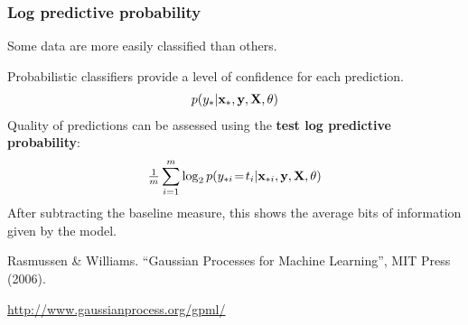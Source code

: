 
\begin{frame}
\frametitle{Log predictive probability}
Some data are more easily classified than others.\par
Probabilistic classifiers provide a level of confidence for each prediction.
\begin{align*}
p(y_*|{\bf x}_*,{\bf y},{\bf X},\theta)
\end{align*}
Quality of predictions can be assessed using the {\bf test log predictive probability}:
\begin{align*}
\tfrac{1}{m}\sum_{i=1}^m \log_2 p(y_{*i}\!=\!t_i|{\bf x}_{*i},{\bf y},{\bf X},\theta)
\end{align*}
After subtracting the baseline measure, this shows the average bits of information given by the model.\par
\vspace{0.25cm}
\begin{tiny}
Rasmussen \& Williams. ``Gaussian Processes for Machine Learning'', MIT Press (2006).\par
\url{http://www.gaussianprocess.org/gpml/}\par
\end{tiny}
\end{frame}

